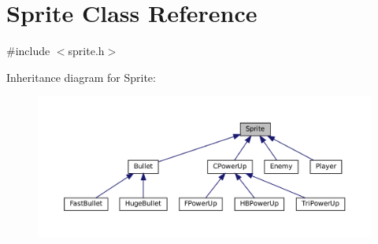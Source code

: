 \hypertarget{classSprite}{}\section{Sprite Class Reference}
\label{classSprite}


{\ttfamily \#include $<$sprite.\+h$>$}



Inheritance diagram for Sprite\+:\nopagebreak
\begin{figure}[H]
\begin{center}
\leavevmode
\includegraphics[width=350pt]{classSprite__inherit__graph}
\end{center}
\end{figure}
